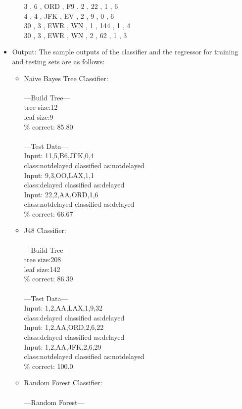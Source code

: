 \begin{itemize}
\begin{itemize}
3 , 6 , ORD , F9 , 2 , 22 , 1 , 6\\
4 , 4 , JFK , EV , 2 , 9 , 0 , 6\\
30 , 3 , EWR , WN , 1 , 144 , 1 , 4\\
30 , 3 , EWR , WN , 2 , 62 , 1 , 3
\end{itemize}
\item{Output: The sample outputs of the classifier and the regressor for training and testing sets are as follows:}
\begin{itemize}
\item{Naive Bayes Tree Classifier:}
\\\\---Build Tree---\\
tree size:12\\
leaf size:9\\
\% correct: 85.80\\
\\---Test Data---\\
Input: 11,5,B6,JFK,0,4\\
class:notdelayed classified as:notdelayed\\
Input: 9,3,OO,LAX,1,1\\
class:delayed classified as:delayed\\
Input: 22,2,AA,ORD,1,6\\
class:notdelayed classified as:delayed\\
\% correct: 66.67\\
\item{J48 Classifier:}
\\\\---Build Tree---\\
tree size:208\\
leaf size:142\\
\% correct: 86.39\\
\\---Test Data---\\
Input: 1,2,AA,LAX,1,9,32\\
class:delayed  classified as:delayed\\
Input: 1,2,AA,ORD,2,6,22\\
class:delayed  classified as:delayed\\
Input: 1,2,AA,JFK,2,6,29\\
class:notdelayed classified as:notdelayed\\
\% correct: 100.0\\
\item{Random Forest Classifier:}
\\\\---Random Forest---\\

\end{itemize}
\end{itemize}
